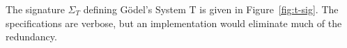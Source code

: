 \documentclass[11pt,twoside]{article}
\newcommand{\parens}[1]{(#1)}
\newcommand{\arrclass}[2]{{#1}\to{#2}}
\begin{document}
The signature $\Sigma_{T}$ defining G\"{o}del's System T is given in Figure~\ref{fig:t-sig}.
The specifications are verbose, but an implementation would eliminate much of the
redundancy.

\begin{comment}
In particular the outermost quantifiers on the classes of constants can be
safely omitted when their class is evident.  For example, it would be sensible to drop the
quantification over objects of sort $\tpsort$ in Figure~\ref{fig:t-sig}.  For example, the
declaration of $\lamcon$ could be abbreviated to
\begin{align*}
  \lamcon & : \arrclass{\parens{\arrclass{\elof{A_{1}}}{\elof{A_{2}}}}}{\elofp{\arrof{A_{1}}{A_{2}}}},
\end{align*}
with the outermost quantification over $A_{1}$ and $A_{2}$ of sort $\tpsort$ being
understood.  Correspondinly, it would be sensible to write $\lamof{\_{}}{\_{}}{F}$ when
the class of $F$ is given as $\arrclass{\elof{A_{1}}}{\elof{A_{2}}}$, the omitted
arguments being inferrable from context.  An abbreviated form of $\Sigma_{T}$ is given in
Figure~\ref{fig:t-sig-abbr} for comparison.
\end{comment}
\end{document}
